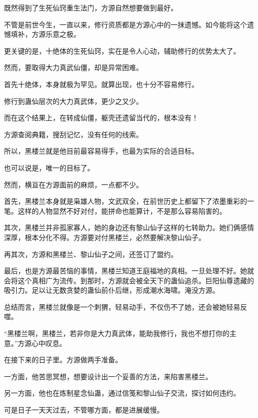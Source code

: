 
\begin{this_body}



既然得到了生死仙窍重生法门，方源自然想要做到最好。

不管是前世今生，一直以来，修行资质都是方源心中的一抹遗憾。如今能将这个遗憾填补，方源乐意之极。

更关键的是，十绝体的生死仙窍，实在是令人心动，辅助修行的优势太大了。

然而，要取得大力真武仙僵，却是异常困难。

首先十绝体，本身就极为罕见。就算出现，也十分不容易修行。

修行到蛊仙层次的大力真武体，更少之又少。

而在这个结果上，在转成仙僵，躯壳还遗留当代的，根本没有！

方源查阅典籍，搜刮记忆，没有任何的线索。

所以，黑楼兰就是他目前最容易得手，也最为实际的合适目标。

也可以说是，唯一的目标了。

然而，横亘在方源面前的麻烦，一点都不少。

首先，黑楼兰本身就是枭雄人物，文武双全，在前世历史上都留下了浓墨重彩的一笔。这样的人物显然不好对付，能拼命也能算计，不是那么容易陷害的。

其次，黑楼兰并非孤家寡人，她的身边还有黎山仙子这样的七转助力。她们俩感情深厚，根本分化不得。方源要对付黑楼兰，必然要解决黎山仙子。

再其次，方源和黑楼兰、黎山仙子之间，还签订了盟约。

最后，也是方源最苦恼的事情，黑楼兰知道王庭福地的真相。一旦处理不好。她就会将这个真相广为流传。到那时，方源就会被全天下的蛊仙追杀。巨阳仙尊遗藏的吸引力。足以让无数贪婪的蛊仙前仆后继，形成潮水海啸。淹没方源。

总结而言，黑楼兰就像是一个刺猬，轻易动手，不仅伤不了她，还会被她轻易反噬。

“黑楼兰啊，黑楼兰，若非你是大力真武体，能助我修行，我也不想打你的主意。”方源心中叹息。

在接下来的日子里。方源做两手准备。

一方面，他苦思冥想，想要设计出一个妥善的方法，来陷害黑楼兰。

另一方面，他也在炼制星念仙蛊，通过信笺和黎山仙子交流，探讨如何违约。

可是日子一天天过去，不管哪方面，都是进展缓慢。


\end{this_body}
